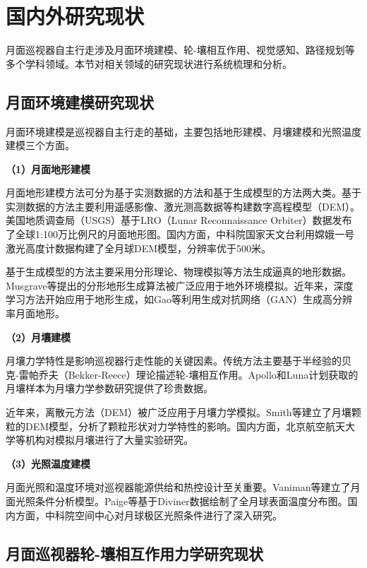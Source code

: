 \section{国内外研究现状}
\label{sec:research_status}

月面巡视器自主行走涉及月面环境建模、轮-壤相互作用、视觉感知、路径规划等多个学科领域。本节对相关领域的研究现状进行系统梳理和分析。

\subsection{月面环境建模研究现状}
\label{subsec:env_modeling}

月面环境建模是巡视器自主行走的基础，主要包括地形建模、月壤建模和光照温度建模三个方面。

\textbf{（1）月面地形建模}

月面地形建模方法可分为基于实测数据的方法和基于生成模型的方法两大类。基于实测数据的方法主要利用遥感影像、激光测高数据等构建数字高程模型（DEM）。美国地质调查局（USGS）基于LRO（Lunar Reconnaissance Orbiter）数据发布了全球1:100万比例尺的月面地形图\cite{ref7}。国内方面，中科院国家天文台利用嫦娥一号激光高度计数据构建了全月球DEM模型，分辨率优于500米\cite{ref8}。

基于生成模型的方法主要采用分形理论、物理模拟等方法生成逼真的地形数据。Musgrave等\cite{ref9}提出的分形地形生成算法被广泛应用于地外环境模拟。近年来，深度学习方法开始应用于地形生成，如Gao等\cite{ref10}利用生成对抗网络（GAN）生成高分辨率月面地形。

\textbf{（2）月壤建模}

月壤力学特性是影响巡视器行走性能的关键因素。传统方法主要基于半经验的贝克-雷帕乔夫（Bekker-Reece）理论描述轮-壤相互作用\cite{ref11}。Apollo和Luna计划获取的月壤样本为月壤力学参数研究提供了珍贵数据\cite{ref12}。

近年来，离散元方法（DEM）被广泛应用于月壤力学模拟。Smith等\cite{ref13}建立了月壤颗粒的DEM模型，分析了颗粒形状对力学特性的影响。国内方面，北京航空航天大学等机构对模拟月壤进行了大量实验研究\cite{ref14}。

\textbf{（3）光照温度建模}

月面光照和温度环境对巡视器能源供给和热控设计至关重要。Vaniman等\cite{ref15}建立了月面光照条件分析模型。Paige等\cite{ref16}基于Diviner数据绘制了全月球表面温度分布图。国内方面，中科院空间中心对月球极区光照条件进行了深入研究\cite{ref17}。

\subsection{月面巡视器轮-壤相互作用力学研究现状}
\label{subsec:wheel_soil}


